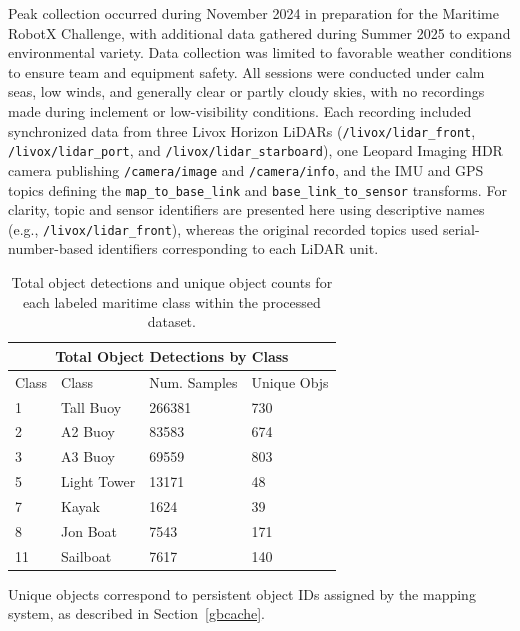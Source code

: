 \documentclass{erauthesis}
\begin{document}
Peak collection occurred during November 2024 in preparation for the Maritime RobotX Challenge, with additional data gathered during Summer 2025 to expand environmental variety.  
Data collection was limited to favorable weather conditions to ensure team and equipment safety. 
All sessions were conducted under calm seas, low winds, and generally clear or partly cloudy skies, with no recordings made during inclement or low-visibility conditions.
Each recording included synchronized data from three Livox Horizon LiDARs  (\texttt{/livox/lidar\_front}, \texttt{/livox/lidar\_port}, and  \texttt{/livox/lidar\_starboard}), one Leopard Imaging HDR camera publishing  \texttt{/camera/image} and \texttt{/camera/info}, and the IMU and GPS topics defining the  \texttt{map\_to\_base\_link} and \texttt{base\_link\_to\_sensor} transforms.
For clarity, topic and sensor identifiers are presented here using descriptive names (e.g., \texttt{/livox/lidar\_front}), whereas the original recorded topics used serial-number-based identifiers corresponding to each LiDAR unit.


\begin{table}[ht]
\centering
\begin{tabular}{llll}
\hline
\multicolumn{4}{c}{Total Object Detections by Class}\\
\hline
\hline
Class & Class       & Num. Samples & Unique Objs \\
1     & Tall Buoy   & 266381       & 730         \\
2     & A2 Buoy     & 83583        & 674         \\
3     & A3 Buoy     & 69559        & 803         \\
5     & Light Tower & 13171        & 48          \\
7     & Kayak       & 1624         & 39          \\
8     & Jon Boat    & 7543         & 171         \\
11    & Sailboat    & 7617         & 140  \\      
\hline
\end{tabular}
\caption{Total object detections and unique object counts for each labeled maritime class within the processed dataset.}
\label{tab:obj_class_dets}
\end{table}

Unique objects correspond to persistent object IDs assigned by the mapping system, as described in Section~\ref{gbcache}.
\end{document}

